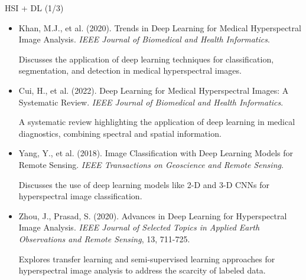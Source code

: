 \documentclass[10pt,svgnames,fragile]{beamer}
\begin{document}
\begin{frame}{HSI + DL (1/3)}
\footnotesize
\begin{itemize}
    \item Khan, M.J., et al. (2020). Trends in Deep Learning for Medical Hyperspectral Image Analysis. \textit{IEEE Journal of Biomedical and Health Informatics}. \href{https://consensus.app/papers/trends-deep-learning-medical-hyperspectral-image-khan/df926a1f23575de086631c2a78a80c3b/?utm_source=chatgpt}{\color{blue}{DOI: 10.1109/JBHI.2020.3005904}}

    {\color{gray}Discusses the application of deep learning techniques for classification, segmentation, and detection in medical hyperspectral images.}

    \item Cui, H., et al. (2022). Deep Learning for Medical Hyperspectral Images: A Systematic Review. \textit{IEEE Journal of Biomedical and Health Informatics}. \href{https://consensus.app/papers/deep-learning-medical-hyperspectral-images-review-cui/f417345410c95b21b20d7aba8a773f9b/?utm_source=chatgpt}{\color{blue}{DOI: 10.1109/JBHI.2022.3140152}}

    {\color{gray}A systematic review highlighting the application of deep learning in medical diagnostics, combining spectral and spatial information.}

    \item Yang, Y., et al. (2018). Image Classification with Deep Learning Models for Remote Sensing. \textit{IEEE Transactions on Geoscience and Remote Sensing}. \href{https://consensus.app/papers/image-classification-with-deep-learning-models-yang/26245f0c21415e8e85c9e8b0a5085376/?utm_source=chatgpt}{\color{blue}{DOI: 10.1109/TGRS.2018.2845367}}

    {\color{gray}Discusses the use of deep learning models like 2-D and 3-D CNNs for hyperspectral image classification.}

    \item Zhou, J., Prasad, S. (2020). Advances in Deep Learning for Hyperspectral Image Analysis. \textit{IEEE Journal of Selected Topics in Applied Earth Observations and Remote Sensing}, 13, 711-725. \href{https://consensus.app/papers/advances-deep-learning-hyperspectral-image-zhou/17caa3d1f836545db0a099a1d43e708e/?utm_source=chatgpt}{\color{blue}{DOI: 10.1109/JSTARS.2020.2987548}}

    {\color{gray}Explores transfer learning and semi-supervised learning approaches for hyperspectral image analysis to address the scarcity of labeled data.}
\end{itemize}
\end{frame}
\end{document}
